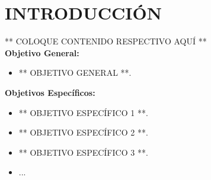 \chapter*{INTRODUCCIÓN}
\thispagestyle{empty}

** COLOQUE CONTENIDO RESPECTIVO AQUÍ **\\

\textbf{Objetivo General:}

\begin{itemize}
    \item ** OBJETIVO GENERAL **.
\end{itemize}

\textbf{Objetivos Específicos:}

\begin{itemize}
    \item ** OBJETIVO ESPECÍFICO 1 **.
    \item ** OBJETIVO ESPECÍFICO 2 **.
    \item ** OBJETIVO ESPECÍFICO 3 **.
    \item ...
\end{itemize}
